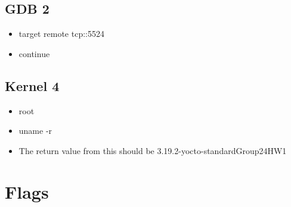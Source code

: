 \documentclass[onecolumn, draftclsnofoot,10pt, compsoc]{IEEEtran}
\begin{document}
    \subsection{GDB 2}
        \begin{itemize}
          \item target remote tcp::5524
            \item continue
        \end{itemize}

    \subsection{Kernel 4}
        \begin{itemize}
            \item root
            \item uname -r
            \item The return value from this should be 3.19.2-yocto-standardGroup24HW1
        \end{itemize}

\section{Flags}
\end{document}
